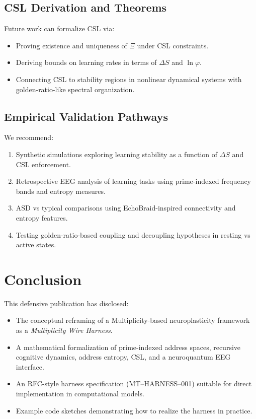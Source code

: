 \documentclass[11pt]{article}
\begin{document}
\subsection{CSL Derivation and Theorems}

Future work can formalize CSL via:

\begin{itemize}[noitemsep]
  \item Proving existence and uniqueness of $\Xi$ under CSL constraints.
  \item Deriving bounds on learning rates in terms of $\Delta S$ and $\ln \varphi$.
  \item Connecting CSL to stability regions in nonlinear dynamical systems with golden-ratio-like spectral organization. \cite{StabilityRegions}
\end{itemize}

\subsection{Empirical Validation Pathways}

We recommend:

\begin{enumerate}[noitemsep]
  \item Synthetic simulations exploring learning stability as a function of $\Delta S$ and CSL enforcement.
  \item Retrospective EEG analysis of learning tasks using prime-indexed frequency bands and entropy measures. \cite{EEGEntropyForce,EEGEntropyBiomarker}
  \item ASD vs typical comparisons using EchoBraid-inspired connectivity and entropy features. \cite{EEGEntropyASD,EEGEntropyASD2,EEGEntropyASD3}
  \item Testing golden-ratio-based coupling and decoupling hypotheses in resting vs active states. \cite{GoldenEEG}
\end{enumerate}

\section{Conclusion}

This defensive publication has disclosed:

\begin{itemize}[noitemsep]
  \item The conceptual reframing of a Multiplicity-based neuroplasticity framework as a \emph{Multiplicity Wire Harness}.
  \item A mathematical formalization of prime-indexed address spaces, recursive cognitive dynamics, address entropy, CSL, and a neuroquantum EEG interface.
  \item An RFC-style harness specification (MT--HARNESS--001) suitable for direct implementation in computational models.
  \item Example code sketches demonstrating how to realize the harness in practice.
\end{itemize}
\end{document}
